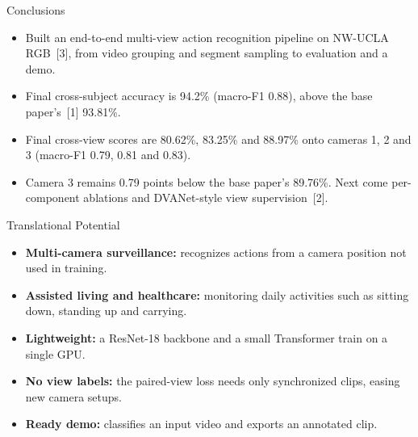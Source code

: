 \documentclass{article}
\begin{document}
\begin{tcbraster}[raster columns=2,raster equal height=rows,raster column skip=8mm,raster after skip=4mm]
\begin{psec}[after skip=0pt]{Conclusions}
\begin{itemize}
\item Built an end-to-end multi-view action recognition pipeline on NW-UCLA RGB~[3], from video grouping and segment sampling to evaluation and a demo.
\item Final cross-subject accuracy is 94.2\% (macro-F1 0.88), above the base paper's~[1] 93.81\%.
\item Final cross-view scores are 80.62\%, 83.25\% and 88.97\% onto cameras 1, 2 and 3 (macro-F1 0.79, 0.81 and 0.83).
\item Camera 3 remains 0.79 points below the base paper's 89.76\%. Next come per-component ablations and DVANet-style view supervision~[2].
\end{itemize}
\end{psec}
\begin{psec}[after skip=0pt]{Translational Potential}
\begin{itemize}
\item \textbf{Multi-camera surveillance:} recognizes actions from a camera position not used in training.
\item \textbf{Assisted living and healthcare:} monitoring daily activities such as sitting down, standing up and carrying.
\item \textbf{Lightweight:} a ResNet-18 backbone and a small Transformer train on a single GPU.
\item \textbf{No view labels:} the paired-view loss needs only synchronized clips, easing new camera setups.
\item \textbf{Ready demo:} classifies an input video and exports an annotated clip.
\end{itemize}
\end{psec}
\end{tcbraster}
\end{document}
